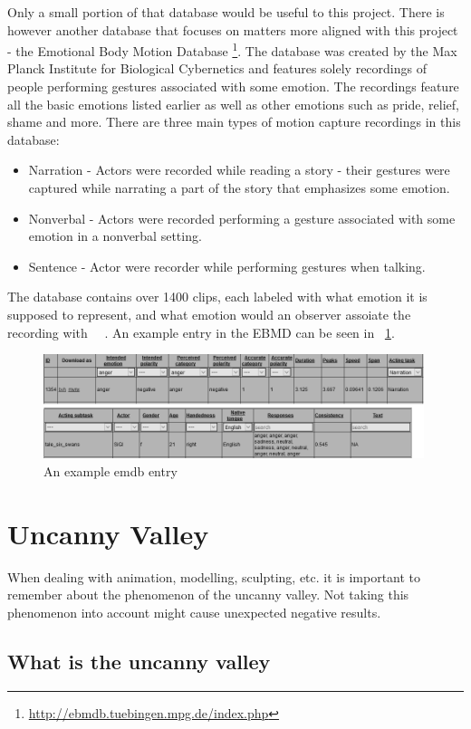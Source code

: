Only a small portion of that database would be useful to this project. There is however another database that focuses on matters more aligned with this project - the Emotional Body Motion Database \footnote{\url{http://ebmdb.tuebingen.mpg.de/index.php}}. The database was created by the Max Planck Institute for Biological Cybernetics and features solely recordings of people performing gestures associated with some emotion. The recordings feature all the basic emotions listed earlier as well as other emotions such as pride, relief, shame and more. There are three main types of motion capture recordings in this database:
\begin{itemize}
\item Narration - Actors were recorded while reading a story - their gestures were captured while narrating a part of the story that emphasizes some emotion.
\item Nonverbal - Actors were recorded performing a gesture associated with some emotion in a nonverbal setting.
\item Sentence - Actor were recorder while performing gestures when talking.
\end{itemize}
The database contains over 1400 clips, each labeled with what emotion it is supposed to represent, and what emotion would an observer assoiate the recording with ~\cite{planck1}~\cite{planck2}. An example entry in the EBMD can be seen in ~\ref{fig:ebmd1}.

\begin{figure}[H]
\centerline{\includegraphics[width = 30em]{img/emo1.png}}
\caption{An example emdb entry}\label{fig:ebmd1}
\end{figure}


\section{Uncanny Valley}

When dealing with animation, modelling, sculpting, etc. it is important to remember about the phenomenon of the uncanny valley. Not taking this phenomenon into account might cause unexpected negative results.

\subsection{What is the uncanny valley}

